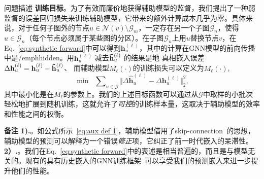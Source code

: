 \begin{section}{问题描述}
\textbf{训练目标}。为了有效而廉价地获得辅助模型的监督，我们提出了一种弱监督的误差回归损失来训练辅助模型，它带来的额外计算成本几乎为零。具体来说，对于任何子图外的节点$u \in \mathcal{N}(v) \setminus \mathcal{G}_{m}$，一定存在另一个子图$\mathcal{G}_{n}$，使得$u \in \mathcal{G}_{n}$（每个节点必须属于某些图的分区）。在子图$\mathcal{G}_{n}$上用$u$替换节点$v$，在Eq.~\ref{eq:synthetic forward}中可以得到$\mathbf{h}_{u}^{(\ell)}$，其中的计算在GNN模型的前向传播中是/emph{hidden}。用$\mathbf{h}_{u}^{(\ell)}$ 减去$\mathbf{\Tilde{h}}^{(\ell)}_u$ 的结果是地 真相嵌入误差 $\Delta\mathbf{h}^{(\ell)}_u = \mathbf{h}_{u}^{(\ell)} - \mathbf{\Tilde{h}}^{(\ell)}_u$、 而辅助模型$M_{\ell}(\cdot)$的训练损失可以定义为$M_{\ell}(\cdot)$, 
\begin{equation}
    \min\;\; \sum\nolimits_{u\in\mathcal{G}} \big\Vert \Delta\mathbf{\hat{h}}^{(\ell)}_u - \Delta\mathbf{h}^{(\ell)}_u \big\Vert_{2}^{2},
\label{eq:aux model loss}
\end{equation}
其中最小化是在$M_{\ell}$的参数上。我们的上述目标函数可以通过从$\mathcal{G}$中取样的小批次轻松地扩展到随机训练，这就允许了\emph{可控}的训练样本量，这取决于辅助模型的效率和性能之间的权衡。

\textbf{备注} \textbf{1).}。如公式所示~\ref{eq:aux def 1}，辅助模型借用了skip-connection~\cite{he2016identity}的思想，辅助模型的预测可以解释为一个错误\emph{修正}项，它纠正了前一时代嵌入的呆滞性。\textbf{2）.}。我们在Eq.~\ref{eq:synthetic forward}中的表述是相当普遍的，而且是与模型无关的。现有的具有历史嵌入的GNN训练框架~\cite{chen2018stochastic,fey2021gnnautoscale,wan2022pipegcn}可以享受我们的预测嵌入来进一步提升他们的性能。






\end{section}